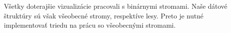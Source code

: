 Všetky doterajšie vizualizácie pracovali s binárnymi stromami. Naše dátové 
štruktúry sú však všeobecné stromy, respektíve lesy. Preto je nutné 
implementovať triedu na prácu so všeobecnými stromami.

